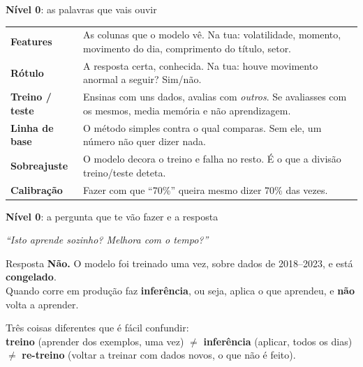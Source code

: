 \documentclass[aspectratio=169]{beamer}
\newcommand{\key}[1]{\textbf{\textcolor{blue!55!black}{#1}}}
\begin{document}
\begin{frame}{\key{Nível 0}: as palavras que vais ouvir}
\small
\begin{tabular}{p{} p{}}
\toprule
\key{Features} & As colunas que o modelo vê. Na tua: volatilidade, momento, movimento do dia,
comprimento do título, setor. \\
\key{Rótulo} & A resposta certa, conhecida. Na tua: houve movimento anormal a seguir? Sim/não. \\
\key{Treino / teste} & Ensinas com uns dados, avalias com \emph{outros}. Se avaliasses com os
mesmos, media memória e não aprendizagem. \\
\key{Linha de base} & O método simples contra o qual comparas. Sem ele, um número não quer dizer
nada. \\
\key{Sobreajuste} & O modelo decora o treino e falha no resto. É o que a divisão treino/teste
deteta. \\
\key{Calibração} & Fazer com que ``70\%'' queira mesmo dizer 70\% das vezes. \\
\bottomrule
\end{tabular}
\end{frame}

\begin{frame}{\key{Nível 0}: a pergunta que te vão fazer e a resposta}
\begin{center}
\emph{``Isto aprende sozinho? Melhora com o tempo?''}
\end{center}
\vspace{4mm}
\begin{block}{Resposta}
\textbf{Não.} O modelo foi treinado uma vez, sobre dados de 2018--2023, e está \key{congelado}.\\
Quando corre em produção faz \key{inferência}, ou seja, aplica o que aprendeu, e \textbf{não} volta a
aprender.
\end{block}
\vspace{3mm}
\footnotesize
Três coisas diferentes que é fácil confundir:\\
\key{treino} (aprender dos exemplos, uma vez) $\neq$
\key{inferência} (aplicar, todos os dias) $\neq$
\key{re-treino} (voltar a treinar com dados novos, o que não é feito).
\end{frame}
\end{document}
